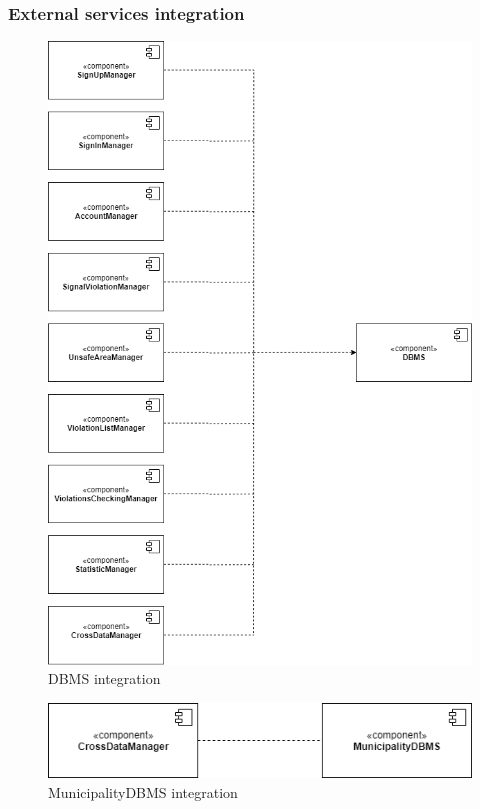         \subsubsection{External services integration}    
            \begin{figure}[H]
                \includegraphics[scale=0.58]{dd/resources/images/Integration-DBMS.png}
                \caption{DBMS integration}        
            \end{figure}
            \begin{figure}[H]
                \includegraphics[scale=0.7]{dd/resources/images/Integration-MunicipalityDBMS.png}
                \caption{MunicipalityDBMS integration}        
            \end{figure}

